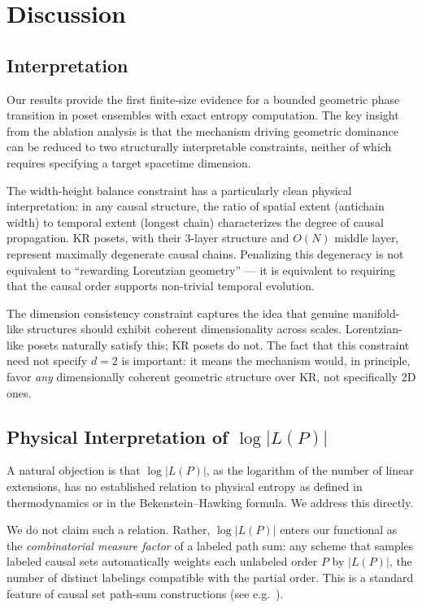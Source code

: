 \documentclass[11pt,a4paper]{article}
\begin{document}
\section{Discussion}

\subsection{Interpretation}

Our results provide the first finite-size evidence for a bounded geometric phase transition in poset ensembles with exact entropy computation. The key insight from the ablation analysis is that the mechanism driving geometric dominance can be reduced to two structurally interpretable constraints, neither of which requires specifying a target spacetime dimension.

The width-height balance constraint has a particularly clean physical interpretation: in any causal structure, the ratio of spatial extent (antichain width) to temporal extent (longest chain) characterizes the degree of causal propagation. KR posets, with their 3-layer structure and $O(N)$ middle layer, represent maximally degenerate causal chains. Penalizing this degeneracy is not equivalent to ``rewarding Lorentzian geometry'' --- it is equivalent to requiring that the causal order supports non-trivial temporal evolution.

The dimension consistency constraint captures the idea that genuine manifold-like structures should exhibit coherent dimensionality across scales. Lorentzian-like posets naturally satisfy this; KR posets do not. The fact that this constraint need not specify $d = 2$ is important: it means the mechanism would, in principle, favor \emph{any} dimensionally coherent geometric structure over KR, not specifically 2D ones.

\subsection{Physical Interpretation of $\log|L(P)|$}
\label{sec:log_interpret}

A natural objection is that $\log|L(P)|$, as the logarithm of the number of
linear extensions, has no established relation to physical entropy as defined in
thermodynamics or in the Bekenstein--Hawking formula. We address this directly.

We do not claim such a relation. Rather, $\log|L(P)|$ enters our functional as
the \emph{combinatorial measure factor} of a labeled path sum: any scheme that
samples labeled causal sets automatically weights each unlabeled order $P$ by
$|L(P)|$, the number of distinct labelings compatible with the partial order.
This is a standard feature of causal set path-sum constructions (see
e.g.~\cite{mathur2021,surya2012}).
\end{document}
